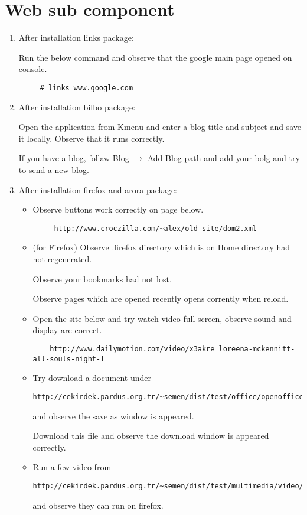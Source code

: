 \documentclass[a4paper,10pt]{article}
\begin{document}
\section{Web sub component}
\begin{enumerate}
\item After installation links package:

  Run the below command and observe that the google main page opened on console.
	\begin{verbatim}
	 # links www.google.com
	\end{verbatim}

\item After installation bilbo package:

Open the application from Kmenu and enter a blog title and subject and save it locally. Observe that it runs correctly.

If you have a blog, follaw Blog $\rightarrow$ Add Blog path and add your bolg and try to send a new blog.

\item After installation firefox and arora package:
\begin{itemize}
 \item Observe buttons work correctly on page below.
	\begin{verbatim}
	 http://www.croczilla.com/~alex/old-site/dom2.xml
	\end{verbatim}
 \item (for Firefox) Observe .firefox directory which is on Home directory had not regenerated.
	
	Observe your bookmarks had not lost.
	
 	Observe pages which are opened recently opens corrently when reload.

\item Open the site below and try watch video full screen, observe sound and display are correct.
	\begin{verbatim}
	http://www.dailymotion.com/video/x3akre_loreena-mckennitt-all-souls-night-l 
	\end{verbatim}
\item Try download a document under \begin{verbatim}http://cekirdek.pardus.org.tr/~semen/dist/test/office/openoffice/\end{verbatim} and observe the save as window is appeared.

Download this file and observe the download window is appeared correctly.
\item Run a few video from \begin{verbatim}http://cekirdek.pardus.org.tr/~semen/dist/test/multimedia/video/cokluortam/\end{verbatim} and observe they can run on firefox.

\end{itemize}

\end{enumerate}
\end{document}
